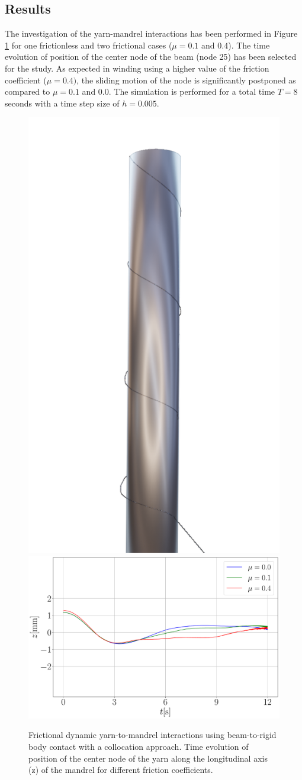 \subsection{Results}
The investigation of the yarn-mandrel interactions has been performed in Figure \ref{fig:fricvalues} for one frictionless and two frictional cases ($\mu = 0.1$ and $0.4$). The time evolution of position of the center node of the beam (node 25) has been selected for the study. As expected in winding using a higher value of the friction coefficient ($\mu = 0.4)$, the sliding motion of the node is significantly postponed as compared to $\mu = 0.1$ and $0.0$. The simulation is performed for a total time $T = 8$ seconds with a time step size of $h = 0.005$.

\begin{figure}[h]
\centering
  \centering
  \includegraphics[width=0.27\linewidth]{figures/steel_mandrel_1.png}\\
  \centering
  \includegraphics[width=0.47\linewidth]{figures/mu_compare.pdf}
\caption{Frictional dynamic yarn-to-mandrel interactions using beam-to-rigid body contact with a collocation approach. Time evolution of position of the center node of the yarn along the longitudinal axis (z) of the mandrel for different friction coefficients.}
\label{fig:fricvalues}
\end{figure}



















